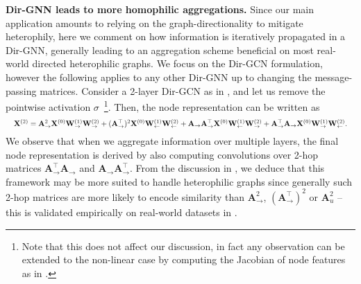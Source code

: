 \documentclass{article}
\newcommand{\inp}{\leftarrow}
\newcommand{\out}{\rightarrow}
\newcommand\oursacro{Dir-GNN}
\theoremstyle{plain}
\theoremstyle{definition}
\theoremstyle{remark}
\begin{document}
\textbf{\oursacro{} leads to more homophilic aggregations.} Since our main application amounts to relying on the graph-directionality to mitigate heterophily, here we comment on how information is iteratively propagated in a \oursacro{}, generally leading to an aggregation scheme beneficial on most real-world directed heterophilic graphs. We focus on the Dir-GCN formulation, however the following applies to any other \oursacro{} up to changing the message-passing matrices. Consider a 2-layer Dir-GCN as in , and let us remove the pointwise activation $\sigma$~\footnote{Note that this does not affect our discussion, in fact any observation can be extended to the non-linear case by computing the Jacobian of node features as in \citet{topping2021understanding}.}. Then, the node representation can be written as 
\begin{equation}
\resizebox{1\hsize}{!}{$\mathbf{X}^{(2)} = \mathbf{A}_{\out}^{2}\mathbf{X}^{(0)}\mathbf{W}^{(1)}_{\out}\mathbf{W}^{(2)}_{\out} + (\mathbf{A}_{\out}^\top)^{2}\mathbf{X}^{(0)}\mathbf{W}^{(1)}_{\inp}\mathbf{W}^{(2)}_{\inp} \notag + \mathbf{A}_{\out}\mathbf{A}_{\out}^\top\mathbf{X}^{(0)}\mathbf{W}^{(1)}_{\inp}\mathbf{W}^{(2)}_{\out} + \mathbf{A}^{\top}_{\out}\mathbf{A}_{\out}\mathbf{X}^{(0)}\mathbf{W}^{(1)}_{\out}\mathbf{W}^{(2)}_{\inp}.$}
\end{equation}
\noindent We observe that when we aggregate information over multiple layers, the final node representation is derived by also computing convolutions over 2-hop matrices $\mathbf{A}_{\out}^\top\mathbf{A}_{\out}$ and $\mathbf{A}_{\out}\mathbf{A}^{\top}_{\out}$. From the discussion in , we deduce that this framework may be more suited to handle heterophilic graphs since generally such 2-hop matrices are more likely to encode similarity than $\mathbf{A}_{\out}^{2}$, $(\mathbf{A}_{\out}^{\top})^{2}$ or $\mathbf{A}_u^{2}$ -- this is validated empirically on real-world datasets in .
\end{document}
